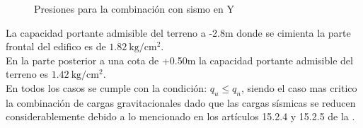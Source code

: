 \begin{figure}[h!]
    \centering
    \hspace{10mm}
    \caption{Presiones para la combinación con sismo en Y}
    \label{corw}
\end{figure}
\noindent
La capacidad portante admisible del terreno a -2.8m donde se cimienta la parte frontal del edifico es de $1.82\mathrm{~kg/cm^2} $.\\
En la parte posterior a una cota de +0.50m la capacidad portante admisible del terreno es $1.42\mathrm{~kg/cm^2}$.\\
En todos los casos se cumple con la condición: $q_{u}\leq q_{n}$, siendo el caso mas critico la combinación de cargas gravitacionales dado que las cargas sísmicas se reducen considerablemente debido a lo mencionado en los artículos 15.2.4 y 15.2.5 de la \cite{E-060}.\\

